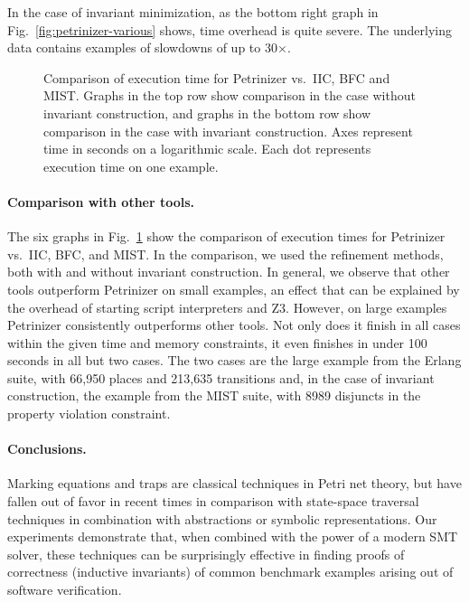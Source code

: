 In the case of invariant minimization, as the bottom right
graph in Fig.~\ref{fig:petrinizer-various} shows, time overhead is
quite severe.
The underlying data contains examples of slowdowns of up to 30$\times$.

\begin{figure}[t]
  \centering 
  \caption[Comparison of execution time for Petrinizer vs.~IIC,
  BFC and MIST.\@]{Comparison of execution time for Petrinizer vs.~IIC,
  BFC and MIST\@. Graphs in the top row show comparison in the case without
  invariant construction, and graphs in the bottom row show comparison in
  the case with invariant construction. Axes represent time in seconds on a
  logarithmic scale. Each dot represents execution time on one example.}
\label{fig:performance-vs-tools}
\end{figure}

\paragraph{Comparison with other tools.} The six graphs in
Fig.~\ref{fig:performance-vs-tools} show the comparison of execution times 
for Petrinizer vs.~IIC, BFC, and MIST\@. 
In the comparison, we used
the refinement methods, both with and without invariant construction.
In general, we observe that other tools outperform
Petrinizer on small examples, an effect that can be explained by the
overhead of starting script interpreters and Z3. 
However, on large examples Petrinizer consistently outperforms other tools.
Not only does it finish in all cases within the given time and memory
constraints, it even finishes in under 100
seconds in all but two cases. The two cases are the
large example from the Erlang suite, with 66,950 places and 213,635
transitions and, in the case of invariant construction, the example
from the MIST suite, with 8989 disjuncts in the property violation constraint.

\paragraph{Conclusions.}
%
Marking equations and traps are classical techniques in Petri net theory, but have fallen out of favor
in recent times in comparison with state-space traversal techniques in combination with abstractions
or symbolic representations.
Our experiments demonstrate that, when combined with the power of a modern SMT solver, these techniques
can be surprisingly effective in finding proofs of correctness (inductive invariants) of common benchmark examples arising
out of software verification.

